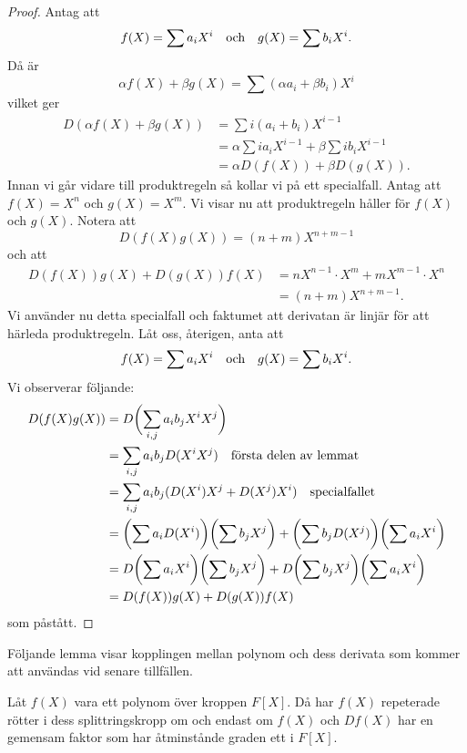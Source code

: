 \documentclass{article}
\theoremstyle{definition}
\begin{document}
\begin{proof}
  Antag att 
  \[f(X) = \sum a_iX^i \quad \textnormal{och} \quad g(X) = \sum b_iX^i.\]
  Då är 
  \[\alpha f(X) + \beta g(X) = \sum (\alpha a_i + \beta b_i)X^i\]
  vilket ger 
  \begin{align*}
    D(\alpha f(X) + \beta g(X)) &= \sum i(a_i + b_i)X^{i-1} \\
    &= \alpha \sum ia_i X^{i-1} + \beta \sum ib_i X^{i-1} \\
    &= \alpha D(f(X)) + \beta D(g(X)).
  \end{align*}
  Innan vi går vidare till produktregeln så kollar vi på ett specialfall. Antag att $f(X) = X^n$ och $g(X) = X^m$. Vi visar nu att 
  produktregeln håller för $f(X)$ och $g(X)$. Notera att 
  \[D(f(X)g(X)) = (n+m)X^{n+m-1}\]
  och att 
  \begin{align*}
    D(f(X))g(X) + D(g(X)) f(X) &= nX^{n-1} \cdot X^m + mX^{m-1} \cdot X^n \\
    &= (n+m)X^{n+m-1}.
  \end{align*}
  Vi använder nu detta specialfall och faktumet att derivatan är linjär för att härleda produktregeln. 
  Låt oss, återigen, anta att
  \[f(X) = \sum a_iX^i \quad \textnormal{och} \quad g(X) = \sum b_iX^i. \]
  Vi observerar följande:
  \begin{align*}
    D(f(X)g(X)) &= D \biggl( \sum_{i, j} a_i b_j X^i X^j\biggr) \\
    &= \sum_{i, j} a_i b_j D(X^iX^j) \quad \textnormal{första delen av lemmat} \\
    &= \sum_{i, j} a_i b_j (D(X^i)X^j + D(X^j)X^i ) \quad \textnormal{specialfallet} \\
    &= \biggl (  \sum a_i D(X^i) \biggr) \biggl (  \sum b_jX^j \biggr) + \biggl ( \sum b_j D(X^j)  \biggr) \biggl ( \sum a_iX^i  \biggr) \\
    &= D \biggl (  \sum a_i X^i \biggr) \biggl (  \sum b_jX^j \biggr) + D \biggl ( \sum b_j X^j  \biggr) \biggl ( \sum a_iX^i  \biggr) \\
    &= D(f(X)) g(X) + D(g(X)) f(X)
  \end{align*}
  som påstått.
\end{proof}

Följande lemma visar kopplingen mellan polynom och dess derivata som kommer att användas vid senare tillfällen. 

\hypertarget{lemma7.1.2}{}
\begin{mylemma}{}{}
  Låt $f(X)$ vara ett polynom över kroppen $F[X]$. Då har $f(X)$ repeterade rötter i dess splittringskropp om och endast om $f(X)$ och $Df(X)$
  har en gemensam faktor som har åtminstånde graden ett i $F[X]$.
\end{mylemma}
\end{document}

